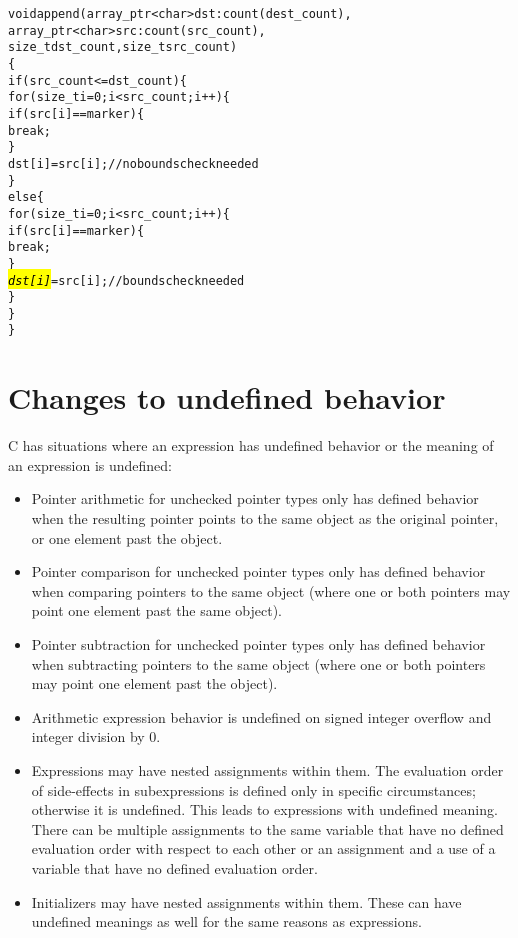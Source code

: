 \begin{alltt}
void append(array\_ptr<char> dst: count(dest\_count), 
            array\_ptr<char> src : count(src\_count), 
            size\_t dst\_count, size_t src\_count)
\{ 
    if (src\_count <= dst\_count) \{
        for (size\_t i = 0; i < src\_count; i++) \{
            if (src[i] == marker) \{
                break;
            \}
            dst[i] = src[i];  // no bounds check needed
        \}   
    else \{
        for (size\_t i = 0; i < src\_count; i++) \{
            if (src[i] == marker) \{
                break;
            \}
            \hl{\textit{dst[i]}} = src[i];  // bounds check needed
        \}   
    \}
\}
\end{alltt}

\section{Changes to undefined behavior}
\label{section:changes-to-undefined-behavior}

C has situations where an expression has undefined behavior or the
meaning of an expression is undefined:

\begin{itemize}
\item
  Pointer arithmetic for unchecked pointer types only has defined behavior when
  the resulting pointer points to the same object as the original pointer, or one
  element past the object.
\item
  Pointer comparison for unchecked pointer types only has defined behavior when comparing
  pointers to the same object (where one or both pointers may point one
  element past the same object).
\item
  Pointer subtraction for unchecked pointer types only has defined behavior when subtracting
  pointers to the same object (where one or both pointers may point one
  element past the object).
\item
  Arithmetic expression behavior is undefined on signed integer overflow
  and integer division by 0.
\item
  Expressions may have nested assignments within them. The evaluation
  order of side-effects in subexpressions is defined only in specific
  circumstances; otherwise it is undefined. This leads to expressions
  with undefined meaning. There can be multiple assignments to the same
  variable that have no defined evaluation order with respect to each
  other or an assignment and a use of a variable that have no defined
  evaluation order.
\item
  Initializers may have nested assignments within them. These can have
  undefined meanings as well for the same reasons as expressions.
\end{itemize}

